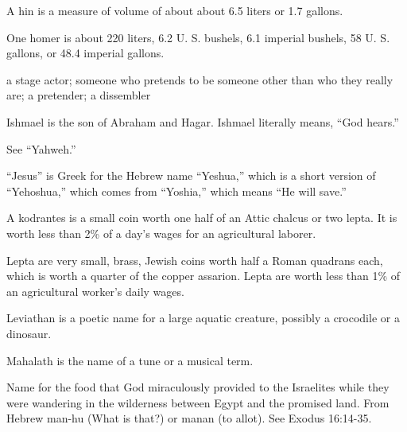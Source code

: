 {\par }{
\par }{\ILIB A hin is a measure of volume of about about 6.5 liters or 1.7 gallons.
\par }{
\par }{\ILIB One homer is about 220 liters, 6.2 U. S. bushels, 6.1 imperial bushels, 58 U. S. gallons, or 48.4 imperial gallons.
\par }{
\par }{\ILIB a stage actor; someone who pretends to be someone other than who they really are; a pretender; a dissembler
\par }{
\par }{\ILIB Ishmael is the son of Abraham and Hagar. Ishmael literally means, “God hears.”
\par }{
\par }{\ILIB See “Yahweh.”
\par }{
\par }{\ILIB “Jesus” is Greek for the Hebrew name “Yeshua,” which is a short version of “Yehoshua,” which comes from “Yoshia,” which means “He will save.”
\par }{
\par }{\ILIB A kodrantes is a small coin worth one half of an Attic chalcus or two lepta. It is worth less than 2\% of a day’s wages for an agricultural laborer.
\par }{
\par }{\ILIB Lepta are very small, brass, Jewish coins worth half a Roman quadrans each, which is worth a quarter of the copper assarion. Lepta are worth less than 1\% of an agricultural worker’s daily wages.
\par }{
\par }{\ILIB Leviathan is a poetic name for a large aquatic creature, possibly a crocodile or a dinosaur.
\par }{
\par }{\ILIB Mahalath is the name of a tune or a musical term.
\par }{
\par }{\ILIB Name for the food that God miraculously provided to the Israelites while they were wandering in the wilderness between Egypt and the promised land. From Hebrew man-hu (What is that?) or manan (to allot). See Exodus 16:14-35.
\par }{
}

